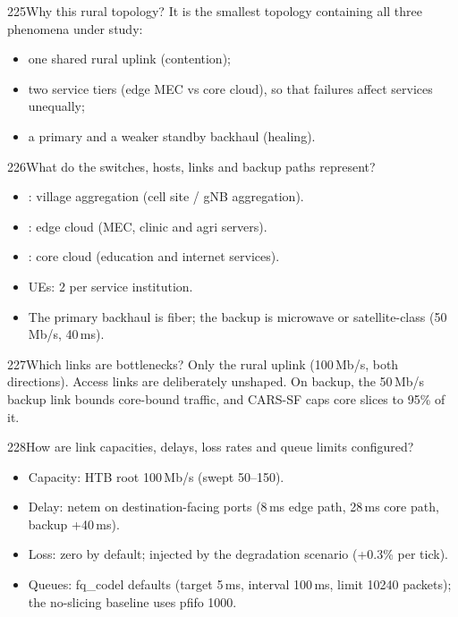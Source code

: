 \FigTopo

\begin{qa}{225}{Why this rural topology?}
It is the smallest topology containing all three phenomena under study:
\begin{itemize}
\item one shared rural uplink (contention);
\item two service tiers (edge MEC vs core cloud), so that failures affect services unequally;
\item a primary and a weaker standby backhaul (healing).
\end{itemize}
\end{qa}

\begin{qa}{226}{What do the switches, hosts, links and backup paths represent?}
\begin{itemize}
\item {}: village aggregation (cell site / gNB aggregation).
\item {}: edge cloud (MEC, clinic and agri servers).
\item {}: core cloud (education and internet services).
\item UEs: 2 per service institution.
\item The primary backhaul is fiber; the backup is microwave or satellite-class (50\,Mb/s, 40\,ms).
\end{itemize}
\end{qa}

\begin{qa}{227}{Which links are bottlenecks?}
Only the rural uplink (100\,Mb/s, both directions). Access links are deliberately unshaped. On backup, the 50\,Mb/s
backup link bounds core-bound traffic, and CARS-SF caps core slices to 95\% of it.
\end{qa}

\begin{qa}{228}{How are link capacities, delays, loss rates and queue limits configured?}
\begin{itemize}
\item Capacity: HTB root 100\,Mb/s (swept 50--150).
\item Delay: netem on destination-facing ports (8\,ms edge path, 28\,ms core path, backup +40\,ms).
\item Loss: zero by default; injected by the degradation scenario (+0.3\% per tick).
\item Queues: fq\_codel defaults (target 5\,ms, interval 100\,ms, limit 10240 packets); the no-slicing baseline uses
pfifo 1000.
\end{itemize}
\end{qa}

